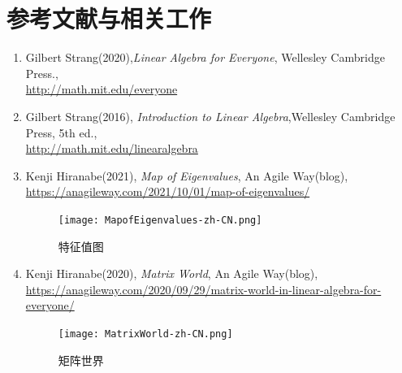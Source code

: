 \documentclass[letterpaper]{article}
\begin{document}
\section*{参考文献与相关工作}
\begin{enumerate}
  \item 
  Gilbert Strang(2020),\emph{Linear Algebra for Everyone}, Wellesley Cambridge Press.,\\
  \href{http://math.mit.edu/everyone}{http://math.mit.edu/everyone}
  \item
  Gilbert Strang(2016), \emph{Introduction to Linear Algebra},Wellesley Cambridge Press, 5th ed.,\\
  \href{http://math.mit.edu/linearalgebra}{http://math.mit.edu/linearalgebra}
  \item Kenji Hiranabe(2021), \emph{Map of Eigenvalues}, An Agile Way(blog),\\
  \href{https://anagileway.com/2021/10/01/map-of-eigenvalues/}{https://anagileway.com/2021/10/01/map-of-eigenvalues/}\\
  \begin{figure}[H]
    \centering
    \texttt{[image: MapofEigenvalues-zh-CN.png]}
    \caption{特征值图}
  \end{figure}
  \item Kenji Hiranabe(2020), \emph{Matrix World}, An Agile Way(blog),\\
  \href{https://anagileway.com/2020/09/29/matrix-world-in-linear-algebra-for-everyone/}{https://anagileway.com/2020/09/29/matrix-world-in-linear-algebra-for-everyone/}
  \begin{figure}[H]
    \centering
    \texttt{[image: MatrixWorld-zh-CN.png]}
    \caption{矩阵世界}
  \end{figure}
\end{enumerate}
\end{document}
